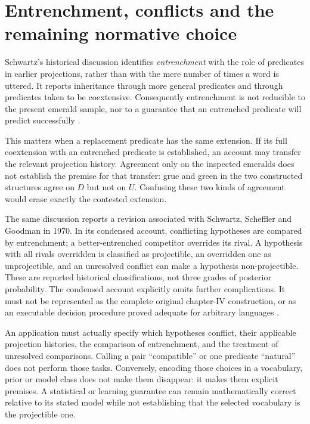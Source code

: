 \section{Entrenchment, conflicts and the remaining normative choice}
\label{sec:p15-goodman-entrenchment}

Schwartz's historical discussion identifies \emph{entrenchment} with the
role of predicates in earlier projections, rather than with the mere
number of times a word is uttered. It reports inheritance through more
general predicates and through predicates taken to be coextensive.
Consequently entrenchment is not reducible to the present emerald sample,
nor to a guarantee that an entrenched predicate will predict successfully
\parencite[\S6, p.~402]{Schwartz2011GoodmanProjectibility}.

This matters when a replacement predicate has the same extension.
If its full coextension with an entrenched predicate is established,
an account may transfer the relevant projection history. Agreement only
on the inspected emeralds does not establish the premise for that
transfer: grue and green in the two constructed structures agree on $D$
but not on $U$. Confusing these two kinds of agreement would erase
exactly the contested extension.

The same discussion reports a revision associated with Schwartz,
Scheffler and Goodman in 1970. In its condensed account, conflicting
hypotheses are compared by entrenchment; a better-entrenched competitor
overrides its rival. A hypothesis with all rivals overridden is classified
as projectible, an overridden one as unprojectible, and an unresolved
conflict can make a hypothesis non-projectible. These are reported
historical classifications, not three grades of posterior probability.
The condensed account explicitly omits further complications. It must
not be represented as the complete original chapter-IV construction,
or as an executable decision procedure proved adequate for arbitrary
languages \parencite[\S6, p.~402 and n.~12]{Schwartz2011GoodmanProjectibility}.

An application must actually specify which hypotheses conflict, their
applicable projection histories, the comparison of entrenchment, and
the treatment of unresolved comparisons. Calling a pair ``compatible''
or one predicate ``natural'' does not perform those tasks. Conversely,
encoding those choices in a vocabulary, prior or model class does not
make them disappear: it makes them explicit premises. A statistical
or learning guarantee can remain mathematically correct relative to
its stated model while not establishing that the selected vocabulary
is the projectible one.

